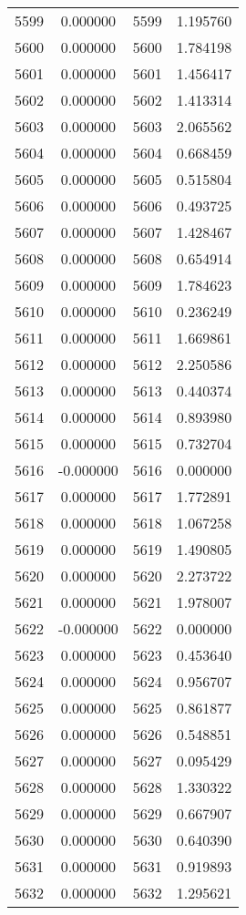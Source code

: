 \documentclass[12pt]{article}
\begin{document}
\begin{longtable}{@{}cccc@{}}
5599 & 0.000000 & 5599 & 1.195760 \\
5600 & 0.000000 & 5600 & 1.784198 \\
5601 & 0.000000 & 5601 & 1.456417 \\
5602 & 0.000000 & 5602 & 1.413314 \\
5603 & 0.000000 & 5603 & 2.065562 \\
5604 & 0.000000 & 5604 & 0.668459 \\
5605 & 0.000000 & 5605 & 0.515804 \\
5606 & 0.000000 & 5606 & 0.493725 \\
5607 & 0.000000 & 5607 & 1.428467 \\
5608 & 0.000000 & 5608 & 0.654914 \\
5609 & 0.000000 & 5609 & 1.784623 \\
5610 & 0.000000 & 5610 & 0.236249 \\
5611 & 0.000000 & 5611 & 1.669861 \\
5612 & 0.000000 & 5612 & 2.250586 \\
5613 & 0.000000 & 5613 & 0.440374 \\
5614 & 0.000000 & 5614 & 0.893980 \\
5615 & 0.000000 & 5615 & 0.732704 \\
5616 & -0.000000 & 5616 & 0.000000 \\
5617 & 0.000000 & 5617 & 1.772891 \\
5618 & 0.000000 & 5618 & 1.067258 \\
5619 & 0.000000 & 5619 & 1.490805 \\
5620 & 0.000000 & 5620 & 2.273722 \\
5621 & 0.000000 & 5621 & 1.978007 \\
5622 & -0.000000 & 5622 & 0.000000 \\
5623 & 0.000000 & 5623 & 0.453640 \\
5624 & 0.000000 & 5624 & 0.956707 \\
5625 & 0.000000 & 5625 & 0.861877 \\
5626 & 0.000000 & 5626 & 0.548851 \\
5627 & 0.000000 & 5627 & 0.095429 \\
5628 & 0.000000 & 5628 & 1.330322 \\
5629 & 0.000000 & 5629 & 0.667907 \\
5630 & 0.000000 & 5630 & 0.640390 \\
5631 & 0.000000 & 5631 & 0.919893 \\
5632 & 0.000000 & 5632 & 1.295621 \\

\end{longtable}
\end{document}
